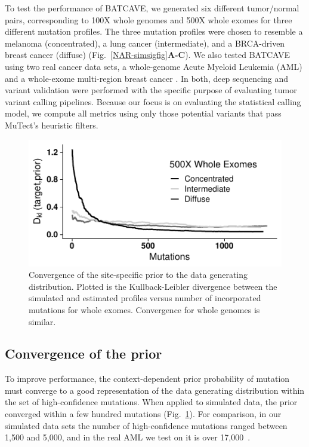 \documentclass[a4,center,fleqn]{NAR}
\newcommand{\batcave}{BATCAVE\xspace}
\begin{document}
To test the performance of \batcave, we generated six different tumor/normal pairs, corresponding to 100X whole genomes and 500X whole exomes for three different mutation profiles.
The three mutation profiles were chosen to resemble a melanoma (concentrated), a lung cancer (intermediate), and a BRCA-driven breast cancer (diffuse) (Fig.~\ref{NAR-simsigfig}\textbf{A-C}).
We also tested \batcave using two real cancer data sets, a whole-genome Acute Myeloid Leukemia (AML) \citep{Griffith2015} and a whole-exome multi-region breast cancer \cite{Shi2018}.
In both, deep sequencing and variant validation were performed with the specific purpose of evaluating tumor variant calling pipelines.
Because our focus is on evaluating the statistical calling model, we compute all metrics using only those potential variants that pass MuTect's heuristic filters.

\begin{figure}
  \begin{center}
  \includegraphics{figures/kl_only.pdf}
  \end{center}
  \caption{Convergence of the site-specific prior to the data generating distribution. Plotted is the Kullback-Leibler divergence between the simulated and estimated profiles versus number of incorporated mutations for whole exomes. Convergence for whole genomes is similar.
  }
\label{NAR-kl_fig}
\end{figure}


\subsection{Convergence of the prior}
To improve performance, the context-dependent prior probability of mutation must converge to a good representation of the data generating distribution within the set of high-confidence mutations.
When applied to simulated data, the prior converged within a few hundred mutations (Fig.~\ref{NAR-kl_fig}).
For comparison, in our simulated data sets the number of high-confidence mutations ranged between 1,500 and 5,000, and in the real AML we test on it is over 17,000~\cite{Griffith2015}.
\end{document}
